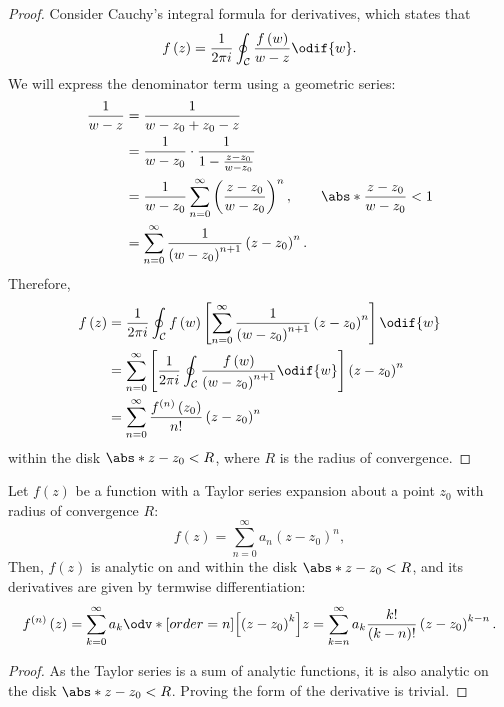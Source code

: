 \documentclass{article}
\begin{document}
\begin{proof}
    Consider Cauchy's integral formula for derivatives, which states
    that
    \begin{equation*}
        f\left( z \right) = \frac{1}{2 \pi i} \oint_{\mathcal{C}} \frac{f\left( w \right)}{w - z} \odif{w}.
    \end{equation*}
    We will express the denominator term using a geometric series:
    \begin{align*}
        \frac{1}{w - z} & = \frac{1}{w - z_0 + z_0 - z}                                                                                               \\
                        & = \frac{1}{w - z_0} \cdot \frac{1}{1 - \frac{z - z_0}{w - z_0}}                                                             \\
                        & = \frac{1}{w - z_0} \sum_{n = 0}^\infty \left( \frac{z - z_0}{w - z_0} \right)^n, \qquad \abs*{\frac{z - z_0}{w - z_0}} < 1 \\
                        & = \sum_{n = 0}^\infty \frac{1}{\left( w - z_0 \right)^{n + 1}} \left( z - z_0 \right)^n.
    \end{align*}
    Therefore,
    \begin{align*}
        f\left( z \right) & = \frac{1}{2 \pi i} \oint_{\mathcal{C}} f\left( w \right) \left[ \sum_{n = 0}^\infty \frac{1}{\left( w - z_0 \right)^{n + 1}} \left( z - z_0 \right)^n \right] \odif{w} \\
                          & = \sum_{n = 0}^\infty \left[ \frac{1}{2 \pi i} \oint_{\mathcal{C}} \frac{f\left( w \right)}{\left( w - z_0 \right)^{n + 1}} \odif{w} \right] \left( z - z_0 \right)^n   \\
                          & = \sum_{n = 0}^\infty \frac{f^{\left( n \right)}\left( z_0 \right)}{n!} \left( z - z_0 \right)^n
    \end{align*}
    within the disk \(\abs*{z - z_0} < R\), where \(R\) is the radius of
    convergence.
\end{proof}
\begin{theorem}
    Let \(f\left( z \right)\) be a function with a Taylor series
    expansion about a point \(z_0\) with radius of convergence \(R\):
    \begin{equation*}
        f\left( z \right) = \sum_{n = 0}^\infty a_n \left( z - z_0 \right)^n,
    \end{equation*}
    Then, \(f\left( z \right)\) is analytic on and within the disk
    \(\abs*{z - z_0} < R\), and its derivatives are given by termwise
    differentiation:
    \begin{equation*}
        f^{\left( n \right)}\left( z \right) = \sum_{k = 0}^\infty a_k \odv*[order=n]{\left[ \left( z - z_0 \right)^k \right]}{z} = \sum_{k = n}^\infty a_k \frac{k!}{\left( k - n \right)!} \left( z - z_0 \right)^{k - n}.
    \end{equation*}
\end{theorem}
\begin{proof}
    As the Taylor series is a sum of analytic functions, it is also
    analytic on the disk \(\abs*{z - z_0} < R\). Proving the form of the
    derivative is trivial.
\end{proof}
\end{document}
